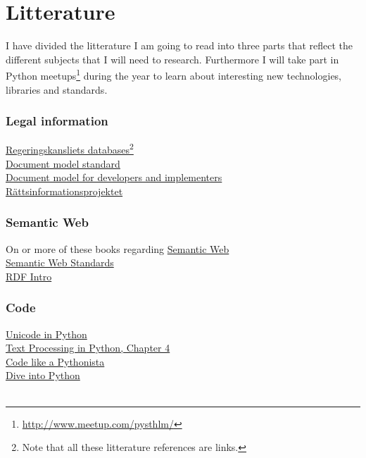 \documentclass[12pt]{report}
\begin{document}
\section*{Litterature}
I have divided the litterature I am going to read into three parts that reflect the different subjects that I will need to research. Furthermore I will take part in Python meetups\footnote[7]{\url{http://www.meetup.com/pysthlm/}} during the year to learn about interesting new technologies, libraries and standards. 
\subsubsection*{Legal information}
\href{http://62.95.69.15/}{Regeringskansliets databases}\footnote[8]{Note that all these litterature references are links.}
\\
\href{http://dev.lagrummet.se/dokumentation/model.pdf}{Document model standard}\\
\href{http://dev.lagrummet.se/dokumentation/introduktion/intro-implementatorer.pdf}{Document model for developers and implementers}\\
\href{http://www.lagrummet.se/Om-lagrummetse/om_lagrummet_se/rattsinformationsprojektet/}{Rättsinformationsprojektet}

\subsubsection*{Semantic Web}
On or more of these books regarding \href{http://www.adlibris.com/se/searchresult.aspx?search=quickfirstpage&quickvalue=semantic+web&title=semantic+web&fromproduct=False}{Semantic Web}\\
\href{http://semanticweb.org/wiki/Semantic_Web_standards}{Semantic Web Standards}\\
\href{http://www.rdfabout.com/quickintro.xpd}{RDF Intro}

\subsubsection*{Code}
\href{http://effbot.org/zone/unicode-objects.htm}{Unicode in Python}\\
\href{http://gnosis.cx/TPiP/}{Text Processing in Python, Chapter 4}\\
\href{http://python.net/~goodger/projects/pycon/2007/idiomatic/handout.html}{Code like a Pythonista}\\
\href{http://www.diveintopython.net/toc/index.html}{Dive into Python}\\\\
\end{document}
